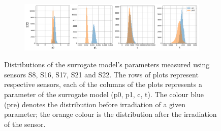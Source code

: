 \begin{figure}
\begin{subfigure}[b]{1.\textwidth}
    \centering
    \includegraphics[width=\linewidth]{figures/chapter4/surrogates/p1_S22_histos.png}
  \end{subfigure}

  \caption[Surrogate parameters distribution part 1]{Distributions of the surrogate model's parameters measured using sensors S8, S16, S17, S21 and S22. The rows of plots represent respective sensors, each of the columns of the plots represents a parameter of the surrogate model (p0, p1, c, t).  The colour blue (pre) denotes the distribution before irradiation of a given parameter; the orange colour is the distribution after the irradiation of the sensor.}
\label{plot:sensor_surrogate_p1}
\end{figure}

